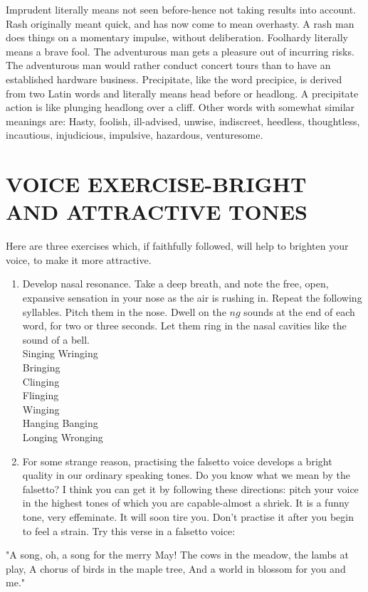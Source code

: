 \documentclass[10pt]{article}
\begin{document}
Imprudent literally means not seen before-hence not taking results into account. Rash originally meant quick, and has now come to mean overhasty. A rash man does things on a momentary impulse, without deliberation. Foolhardy literally means a brave fool. The adventurous man gets a pleasure out of incurring risks. The adventurous man would rather conduct concert tours than to have an established hardware business. Precipitate, like the word precipice, is derived from two Latin words and literally means head before or headlong. A precipitate action is like plunging headlong over a cliff. Other words with somewhat similar meanings are: Hasty, foolish, ill-advised, unwise, indiscreet, heedless, thoughtless, incautious, injudicious, impulsive, hazardous, venturesome.

\section*{VOICE EXERCISE-BRIGHT AND ATTRACTIVE TONES}
Here are three exercises which, if faithfully followed, will help to brighten your voice, to make it more attractive.

\begin{enumerate}
  \item Develop nasal resonance. Take a deep breath, and note the free, open, expansive sensation in your nose as the air is rushing in. Repeat the following syllables. Pitch them in the nose. Dwell on the $n g$ sounds at the end of each word, for two or three seconds. Let them ring in the nasal cavities like the sound of a bell.\\
Singing Wringing\\
Bringing\\
Clinging\\
Flinging\\
Winging\\
Hanging Banging\\
Longing Wronging
  \item For some strange reason, practising the falsetto voice develops a bright quality in our ordinary speaking tones. Do you know what we mean by the falsetto? I think you can get it by following these directions: pitch your voice in the highest tones of which you are capable-almost a shriek. It is a funny tone, very effeminate. It will soon tire you. Don't practise it after you begin to feel a strain. Try this verse in a falsetto voice:
\end{enumerate}

\begin{displayquote}
"A song, oh, a song for the merry May! The cows in the meadow, the lambs at play, A chorus of birds in the maple tree, And a world in blossom for you and me."
\end{displayquote}
\end{document}
